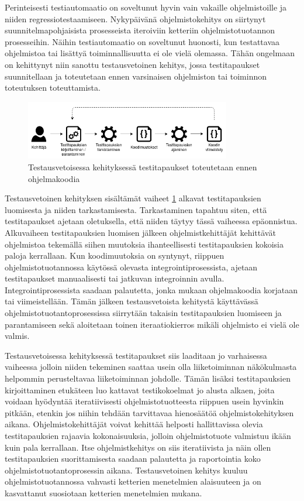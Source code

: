   Perinteisesti testiautomaatio on soveltunut hyvin vain vakaille ohjelmistoille ja niiden regressiotestaamiseen.
  Nykypäivänä ohjelmistokehitys on siirtynyt suunnitelmapohjaisista prosesseista iteroiviin ketteriin ohjelmistotuotannon prosesseihin.
  Näihin testiautomaatio on soveltunut huonosti, kun testattavaa ohjelmistoa tai lisättyä toiminnallisuutta ei ole vielä olemassa.
  Tähän ongelmaan on kehittynyt niin sanottu testausvetoinen kehitys, jossa testitapaukset suunnitellaan ja toteutetaan ennen varsinaisen ohjelmiston tai toiminnon toteutuksen toteuttamista.

  \begin{figure}[H]
    \centering
    \includegraphics[width=0.8\textwidth]{assets/testivetoinen-kehitys.png}
    \caption{Testausvetoisessa kehityksessä testitapaukset toteutetaan ennen ohjelmakoodia}
    \label{fig:testivetoinen-kehitys}
  \end{figure}

  Testausvetoinen kehityksen sisältämät vaiheet \ref{fig:testivetoinen-kehitys} alkavat testitapauksien luomisesta ja niiden tarkastamisesta.
  Tarkastaminen tapahtuu siten, että testitapaukset ajetaan oletuksella, että niiden täytyy tässä vaiheessa epäonnistua.
  Alkuvaiheen testitapauksien luomisen jälkeen ohjelmistkehittäjät kehittävät ohjelmistoa tekemällä siihen muutoksia ihanteellisesti testitapauksien kokoisia paloja kerrallaan.
  Kun koodimuutoksia on syntynyt, riippuen ohjelmistotuotannossa käytössä olevasta integrointiprosessista, ajetaan testitapaukset manuaalisesti tai jatkuvan integroinnin avulla.
  Integrointiprosessista saadaan palautetta, jonka mukaan ohjelmakoodia korjataan tai viimeistellään.
  Tämän jälkeen testausvetoista kehitystä käyttävässä ohjelmistotuotantoprosessissa siirrytään takaisin testitapauksien luomiseen ja parantamiseen sekä aloitetaan toinen iteraatiokierros mikäli ohjelmisto ei vielä ole valmis.

  Testausvetoisessa kehityksessä testitapaukset siis laaditaan jo varhaisessa vaiheessa jolloin niiden tekeminen saattaa usein olla liiketoiminnan näkökulmasta helpommin perusteltavaa liiketoiminnan johdolle.
  Tämän lisäksi testitapauksien kirjoittaminen etukäteen luo kattavat testikokoelmat jo alusta alkaen, joita voidaan hyödyntää iteratiivisesti ohjelmistotuotteesta riippuen usein hyvinkin pitkään, etenkin jos niihin tehdään tarvittavaa hienosäätöä ohjelmistokehityksen aikana.
  Ohjelmistokehittäjät voivat kehittää helposti hallittavissa olevia testitapauksien rajaavia kokonaisuuksia, jolloin ohjelmistotuote valmistuu ikään kuin pala kerrallaan.
  Itse ohjelmistkehitys on siis iteratiivista ja näin ollen testitapauksien suorittamisesta saadaan palautetta ja raportointia koko ohjelmistotuotantoprosessin aikana.
  Testausvetoinen kehitys kuuluu ohjelmistotuotannossa vahvasti ketterien menetelmien alaisuuteen ja on kasvattanut suosiotaan ketterien menetelmien mukana.
